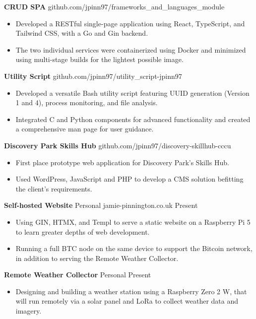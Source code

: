 \documentclass[11pt,letterpaper]{article}
\begin{document}
\textbf{CRUD SPA} \hfill github.com/jpinn97/frameworks\_and\_languages\_module \\
\vspace{-10pt}
\begin{itemize}
  \item Developed a RESTful single-page application using React, TypeScript, and Tailwind CSS, with a Go and Gin backend.
  \item The two individual services were containerized using Docker and minimized using multi-stage builds for the lightest possible image.
\end{itemize}

\textbf{Utility Script} \hfill github.com/jpinn97/utility\_script-jpinn97 \\
\vspace{-10pt}
\begin{itemize}
  \item Developed a versatile Bash utility script featuring UUID generation (Version 1 and 4), process monitoring, and file analysis.
  \item Integrated C and Python components for advanced functionality and created a comprehensive man page for user guidance.
\end{itemize}

\textbf{Discovery Park Skills Hub} \hfill github.com/jpinn97/discovery-skillhub-cccu
\vspace{-10pt}
\begin{itemize}
  \item First place prototype web application for Discovery Park's Skills Hub.
  \item Used WordPress, JavaScript and PHP to develop a CMS solution befitting the client's requirements.
\end{itemize}

\textbf{Self-hosted Website} Personal \hfill jamie-pinnington.co.uk \hfill Present \\
\vspace{-10pt}
\begin{itemize}
  \item Using GIN, HTMX, and Templ to serve a static website on a Raspberry Pi 5 to learn greater depths of web development.
  \item Running a full BTC node on the same device to support the Bitcoin network, in addition to serving the Remote Weather Collector.
\end{itemize}

\textbf{Remote Weather Collector} Personal \hfill Present \\
\vspace{-10pt}
\begin{itemize}
  \item Designing and building a weather station using a Raspberry Zero 2 W, that will run remotely via a solar panel and LoRa to collect weather data and imagery.
\end{itemize}
\end{document}

